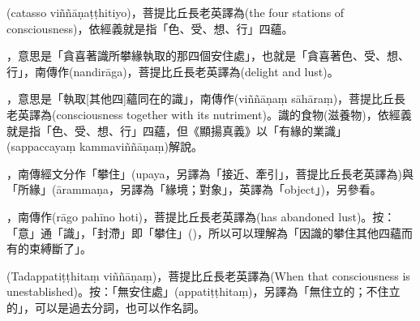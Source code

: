 \startitemgroup[noteitems]
\item{}(catasso viññāṇaṭṭhitiyo)，菩提比丘長老英譯為(the four stations of consciousness)，依經義就是指「色、受、想、行」四蘊。
\stopitemgroup

\startitemgroup[noteitems]
\item{}，意思是「貪喜著識所攀緣執取的那四個安住處」，也就是「貪喜著色、受、想、行」，南傳作(nandirāga)，菩提比丘長老英譯為(delight and lust)。
\stopitemgroup

\startitemgroup[noteitems]
\item{}，意思是「執取[其他四]蘊同在的識」，南傳作(viññāṇaṃ sāhāraṃ)，菩提比丘長老英譯為(consciousness together with its nutriment)。識的食物(滋養物)，依經義就是指「色、受、想、行」四蘊，但《顯揚真義》以「有緣的業識」(sappaccayaṃ kammaviññāṇaṃ)解說。
\stopitemgroup

\startitemgroup[noteitems]
\item{}，南傳經文分作「攀住」(upaya，另譯為「接近、牽引」，菩提比丘長老英譯為)與「所緣」(ārammaṇa，另譯為「緣境；對象」，英譯為「object」)，另參看。
\stopitemgroup

\startitemgroup[noteitems]
\item{}，南傳作(rāgo pahīno hoti)，菩提比丘長老英譯為(has abandoned lust)。按：「意」通「識」，「封滯」即「攀住」()，所以可以理解為「因識的攀住其他四蘊而有的束縛斷了」。
\stopitemgroup

\startitemgroup[noteitems]
\item{}(Tadappatiṭṭhitaṃ viññāṇaṃ)，菩提比丘長老英譯為(When that consciousness is unestablished)。按：「無安住處」(appatiṭṭhitaṃ)，另譯為「無住立的；不住立的」，可以是過去分詞，也可以作名詞。
\stopitemgroup

